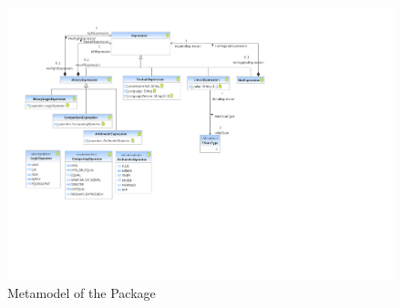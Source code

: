 %
%

\begin{figure}[htb]
  \centering
  \includegraphics[width=\textwidth]{figures/A_technical-reference/packages/core_expressions/expressions}
  \caption{Metamodel of the  Package}
  \label{fig:MM:expressions}
\end{figure}
